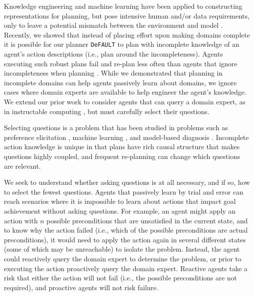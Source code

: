 \documentclass[letterpaper]{article}
\def\citep#1{\cite{#1}}
\def\default{{\tt DeFAULT}}
\begin{document}
Knowledge engineering \citep{ickeps09} and machine learning
\citep{arms,DBLP:conf/aaai/OatesC96} have been applied to constructing
representations for planning, but pose intensive human and/or data requirements,
only to leave a potential mismatch between the environment and model
\citep{modellite}.  Recently, we \cite{bryce-icaps11} showed that instead of
placing effort upon making domains complete it is possible for our planner
\default{} to plan with incomplete knowledge of an agent's action descriptions
(i.e., plan around the incompleteness).  Agents executing such robust plans fail and re-plan less often
 than agents that ignore
incompleteness when planning \citep{DBLP:conf/aips/ChangA06}.  While
we demonstrated that planning in incomplete domains can
help agents passively learn about domains, we ignore cases where domain
experts are available to help engineer the agent's knowledge.  We extend our
prior work \citep{bryce-icaps11} to
consider agents that can query a domain expert, as in instructable computing
\citep{mable}, but must carefully select their questions.

Selecting questions is a problem that has been studied in problems such as
preference elicitation \citep{DBLP:conf/aaai/Boutilier02}, machine learning
\citep{AICPub1812:2011}, and model-based diagnosis
\citep{deKleer:1992:CDS:140524.140531}.  
Incomplete action knowledge is unique in that plans have rich causal structure
that makes questions highly coupled, and frequent re-planning can change which
questions are relevant.  


We seek to understand whether asking questions is at all necessary, and if so,
how to select the fewest questions.  Agents that passively learn by trial and
error can reach scenarios where it is impossible to learn about actions that impact goal
achievement without asking questions. For example, an agent might apply an
action with $n$ possible preconditions that are unsatisfied in the current
state, and to know why the action failed (i.e., which of the possible
preconditions are actual preconditions), it would need to apply the action again in 
several different states (some of which may be unreachable) to isolate the
problem. Instead, the agent could reactively query the domain expert to determine the problem, or prior to
executing the action proactively query the domain expert.  Reactive agents take
a risk that either the action will not fail (i.e., the possible preconditions
are not required), and proactive agents will not risk failure.  
\end{document}
